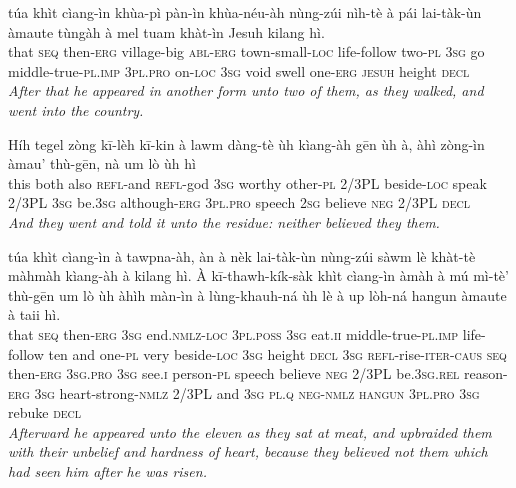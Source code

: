 \documentclass[11pt,a4paper]{article}
\begin{document}
\begin{exe}
\gll túa khìt cìang-ìn khùa-pì pàn-ìn khùa-néu-àh nùng-zúi nìh-tè à pái lai-tàk-ùn àmaute tùngàh à mel tuam khàt-ìn Jesuh kilang hì. \\
     that \textsc{seq} then-\textsc{erg} village-big \textsc{abl}-\textsc{erg} town-small-\textsc{loc} life-follow two-\textsc{pl} \textsc{3sg} go middle-true-\textsc{pl}.\textsc{imp} \textsc{3pl}.\textsc{pro} on-\textsc{loc} \textsc{3sg} void swell one-\textsc{erg} \textsc{jesuh} height \textsc{decl} \\
\glt \textcolor{kjvcolor}{\textit{After that he appeared in another form unto two of them, as they walked, and went into the country.}}

\gll Híh tegel zòng kī-lèh kī-kin à lawm dàng-tè ùh kìang-àh gēn ùh à, àhì zòng-ìn àmau' thù-gēn, nà um lò ùh hì \\
     this both also \textsc{refl}-and \textsc{refl}-god \textsc{3sg} worthy other-\textsc{pl} 2/3PL beside-\textsc{loc} speak 2/3PL \textsc{3sg} be.\textsc{3sg} although-\textsc{erg} \textsc{3pl}.\textsc{pro} speech \textsc{2sg} believe \textsc{neg} 2/3PL \textsc{decl} \\
\glt \textcolor{kjvcolor}{\textit{And they went and told it unto the residue: neither believed they them.}}

\gll túa khìt cìang-ìn à tawpna-àh, àn à nèk lai-tàk-ùn nùng-zúi sàwm lè khàt-tè màhmàh kìang-àh à kilang hì. À kī-thawh-kík-sàk khìt cìang-ìn àmàh à mú mì-tè' thù-gēn um lò ùh àhìh màn-ìn à lùng-khauh-ná ùh lè à up lòh-ná hangun àmaute à taii hì. \\
     that \textsc{seq} then-\textsc{erg} \textsc{3sg} end.\textsc{nmlz}-\textsc{loc} \textsc{3pl}.\textsc{poss} \textsc{3sg} eat.\textsc{ii} middle-true-\textsc{pl}.\textsc{imp} life-follow ten and one-\textsc{pl} very beside-\textsc{loc} \textsc{3sg} height \textsc{decl} \textsc{3sg} \textsc{refl}-rise-\textsc{iter}-\textsc{caus} \textsc{seq} then-\textsc{erg} \textsc{3sg}.\textsc{pro} \textsc{3sg} see.\textsc{i} person-\textsc{pl} speech believe \textsc{neg} 2/3PL be.\textsc{3sg}.\textsc{rel} reason-\textsc{erg} \textsc{3sg} heart-strong-\textsc{nmlz} 2/3PL and \textsc{3sg} \textsc{pl}.\textsc{q} \textsc{neg}-\textsc{nmlz} \textsc{hangun} \textsc{3pl}.\textsc{pro} \textsc{3sg} rebuke \textsc{decl} \\
\glt \textcolor{kjvcolor}{\textit{Afterward he appeared unto the eleven as they sat at meat, and upbraided them with their unbelief and hardness of heart, because they believed not them which had seen him after he was risen.}}


\end{exe}
\end{document}
